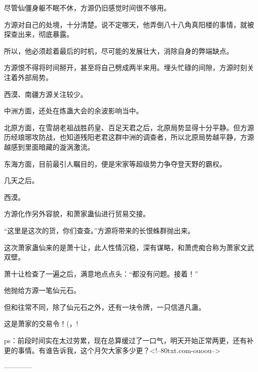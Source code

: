 \begin{this_body}
尽管仙僵身躯不眠不休，方源仍旧感觉时间很不够用。

方源对自己的处境，十分清楚。说不定哪天，他弄倒八十八角真阳楼的事情，就被探查出来，彻底暴露。

所以，他必须趁着最后的时机，尽可能的发展壮大，消除自身的弊端缺点。

方源恨不得将时间掰开，甚至将自己劈成两半来用。埋头忙碌的间隙，方源时刻关注着外部局势。

西漠、南疆方源关注较少。

中洲方面，还处在炼蛊大会的余波影响当中。

北原方面，在雪胡老祖战胜药皇、百足天君之后，北原局势显得十分平静。但方源历经琅琊攻防战，也知道残阳老君这群中洲的调查者，所以北原局势越平静，方源越感到里面暗藏的漩涡激流。

东海方面，目前最引人瞩目的，便是宋家等超级势力争夺登天野的霸权。

几天之后。

西漠。

方源化作另外容貌，和萧家蛊仙进行贸易交接。

“这里是这次的货，你们查查。”方源将带来的长恨蛛群抛出来。

这次萧家蛊仙来的是萧十让，此人性情沉稳，深有谋略，和萧虎痴合称为萧家文武双壁。

萧十让检查了一遍之后，满意地点点头：“都没有问题。接着！”

他抛给方源一笔仙元石。

但和往常不同，除了仙元石之外，还有一块令牌，一只信道凡蛊。

这是萧家的交易令！(，!

ps：前段时间实在太过劳累，现在总算缓过了一口气，明天开始正常两更，还有补更的事情。有谁告诉我，这个月欠大家多少更？<!--80txt.com-ouoou-->

------------

\end{this_body}

